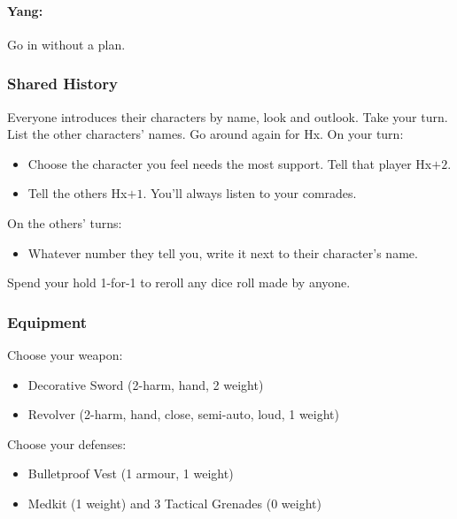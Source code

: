 \paragraph{Yang:} Go in without a plan.

\subsubsection{Shared History}
Everyone introduces their characters by name, look and outlook. Take
your turn. List the other characters' names. Go around again for
Hx. On your turn:
\begin{itemize} %
\item Choose the character you feel needs the most support. Tell that player Hx$+2$.
\item Tell the others Hx$+1$. You'll always listen to your comrades.
\end{itemize}
On the others’ turns:
\begin{itemize} %
\item Whatever number they tell you, write it next to their
  character’s name.
\end{itemize}


           
Spend your hold 1-for-1 to reroll any dice roll made by anyone.

\subsubsection{Equipment}
Choose your weapon:
\begin{itemize}
\item Decorative Sword (2-harm, hand, 2 weight)
\item Revolver (2-harm, hand, close, semi-auto, loud, 1 weight)
\end{itemize}

Choose your defenses:
\begin{itemize}
\item Bulletproof Vest (1 armour, 1 weight)
\item Medkit (1 weight) and 3 Tactical Grenades (0 weight)
\end{itemize}

